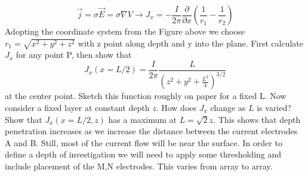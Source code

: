 $$
\vec{j} = \sigma \vec{E} = \sigma \nabla V \rightarrow J_x = -\frac{I}{2\pi} \frac{\partial }{\partial x} \left(\frac{1}{r_1} - \frac{1}{r_2}\right )
$$
Adopting the coordinate system from the Figure above we choose $r_1 =\sqrt{x^2+y^2+z^2}$ with z point along depth and y into the plane. First calculate $J_x$ for any point P, then show that 
$$
J_x (x=L/2) = \frac{I}{2\pi}\frac{L}{(z^2+y^2+\frac{L^2}{4})^{3/2}}
$$
at the center point. Sketch this function roughly on paper for a fixed L. Now consider a fixed layer at constant depth $z$. How does $J_x$ change as $L$ is varied? Show that $J_x(x=L/2,z)$ has a maximum at $L=\sqrt{2}{z}$. This shows that depth penetration increases as we increase the distance between the current electrodes A and B. Still, most of the current flow will be near the surface. In order to define a depth of investigation we will need to apply some thresholding and include placement of the M,N electrodes. This varies from array to array.
\ifanswers
